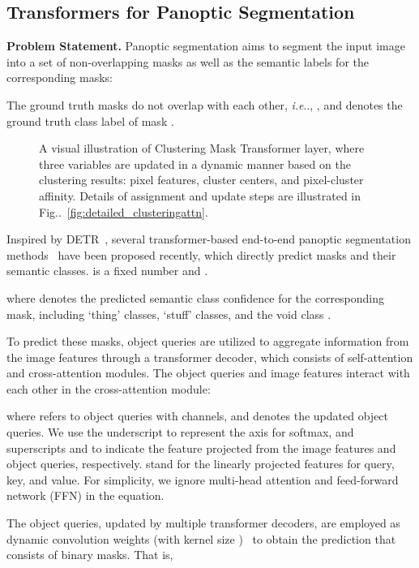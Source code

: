 \documentclass[10pt,twocolumn,letterpaper]{article}
\makeatletter
\DeclareRobustCommand\onedot{\futurelet\@let@token\@onedot}
\def\@onedot{\ifx\@let@token.\else.\null\fi\xspace}
\def\ie{\emph{i.e}\onedot} \def\Ie{\emph{I.e}\onedot}
\newcommand{\figref}[1]{Fig\onedot~\ref{#1}}
\makeatother
\begin{document}
\subsection{Transformers for Panoptic Segmentation}
\noindent\textbf{Problem Statement.} Panoptic segmentation aims to segment the input image  into a set of non-overlapping masks as well as the semantic labels for the corresponding masks:

The  ground truth masks  do not overlap with each other, \ie, , and  denotes the ground truth class label of mask .

\begin{figure}[t]
    \centering
    \caption{A visual illustration of Clustering Mask Transformer layer, where three variables are updated in a dynamic manner based on the clustering results: pixel features, cluster centers, and pixel-cluster affinity. Details of assignment and update steps are illustrated in \figref{fig:detailed_clusteringattn}.}
    \label{fig:clusteringattn}
\end{figure}

Inspired by DETR~\cite{carion2020end}, several transformer-based end-to-end panoptic segmentation methods~\cite{wang2021max} have been proposed recently, which directly predict  masks and their semantic classes.  is a fixed number and .

where  denotes the predicted semantic class confidence for the corresponding mask, including `thing' classes, `stuff' classes, and the void class .

To predict these  masks,  object queries are utilized to aggregate information from the image features through a transformer decoder, which consists of self-attention and cross-attention modules. The object queries and image features interact with each other in the cross-attention module:

where  refers to object queries with  channels, and  denotes the updated object queries. We use the underscript to represent the axis for softmax, and superscripts  and  to indicate the feature projected from the image features and object queries, respectively.  stand for the linearly projected features for query, key, and value. For simplicity, we ignore multi-head attention and feed-forward network (FFN) in the equation.

The object queries, updated by multiple transformer decoders, are employed as dynamic convolution weights (with kernel size )~\cite{jia2016dynamic,tian2020conditional,wang2020solov2} to obtain the prediction  that consists of  binary masks. That is,
\end{document}
